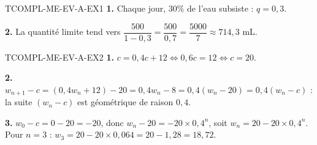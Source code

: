 \begin{corrige}{TCOMPL-ME-EV-A-EX1}
\textbf{1.} Chaque jour, $30\%$ de l'eau subsiste : $q=0{,}3$.

\textbf{2.} La quantité limite tend vers $\dfrac{500}{1-0{,}3} = \dfrac{500}{0{,}7} = \dfrac{5000}{7} \approx 714{,}3$ mL.
\end{corrige}

\begin{corrige}{TCOMPL-ME-EV-A-EX2}
\textbf{1.} $c = 0{,}4c+12 \iff 0{,}6c=12 \iff c=20$.

\textbf{2.} $w_{n+1}-c = (0{,}4w_n+12)-20 = 0{,}4w_n-8 = 0{,}4(w_n-20) = 0{,}4(w_n-c)$ : la suite $(w_n-c)$ est géométrique de raison $0{,}4$.

\textbf{3.} $w_0-c=0-20=-20$, donc $w_n-20=-20\times0{,}4^n$, soit $w_n = 20-20\times0{,}4^n$. Pour $n=3$ : $w_3 = 20-20\times0{,}064=20-1{,}28=18{,}72$.
\end{corrige}

